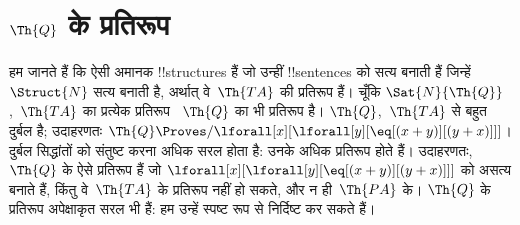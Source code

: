 \documentclass[../../../include/open-logic-section]{subfiles}
\begin{document}
\section{$\Th{Q}$ के प्रतिरूप}

\begin{explain}
हम जानते हैं कि ऐसी अमानक !!{structure}s हैं जो उन्हीं !!{sentence}s को सत्य
बनाती हैं जिन्हें~$\Struct{N}$ सत्य बनाती है, अर्थात् वे~$\Th{TA}$ की
प्रतिरूप हैं। चूँकि $\Sat{N}{\Th{Q}}$,~$\Th{TA}$ का प्रत्येक प्रतिरूप
~$\Th{Q}$ का भी प्रतिरूप है। $\Th{Q}$,~$\Th{TA}$ से बहुत दुर्बल है;
उदाहरणतः
$\Th{Q} \Proves/ \lforall[x][\lforall[y][\eq[(x +
      y)][(y+x)]]]$। दुर्बल सिद्धांतों को संतुष्ट करना अधिक सरल होता है:
उनके अधिक प्रतिरूप होते हैं। उदाहरणतः, $\Th{Q}$ के ऐसे प्रतिरूप हैं जो
$\lforall[x][\lforall[y][\eq[(x + y)][(y+x)]]]$ को असत्य बनाते हैं, किंतु
वे~$\Th{TA}$ के प्रतिरूप नहीं हो सकते, और न ही~$\Th{PA}$ के। $\Th{Q}$ के
प्रतिरूप अपेक्षाकृत सरल भी हैं: हम उन्हें स्पष्ट रूप से निर्दिष्ट कर सकते हैं।
\end{explain}
\end{document}
